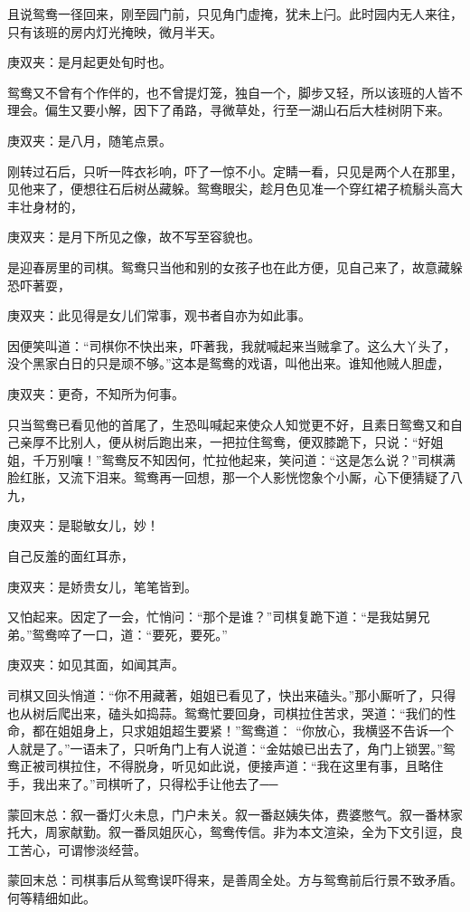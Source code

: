 \begin{parag}
    且说鸳鸯一径回来，刚至园门前，只见角门虚掩，犹未上闩。此时园内无人来往，只有该班的房内灯光掩映，微月半天。\begin{note}庚双夹：是月起更处旬时也。\end{note}鸳鸯又不曾有个作伴的，也不曾提灯笼，独自一个，脚步又轻，所以该班的人皆不理会。偏生又要小解，因下了甬路，寻微草处，行至一湖山石后大桂树阴下来。\begin{note}庚双夹：是八月，随笔点景。\end{note}刚转过石后，只听一阵衣衫响，吓了一惊不小。定睛一看，只见是两个人在那里，见他来了，便想往石后树丛藏躲。鸳鸯眼尖，趁月色见准一个穿红裙子梳鬅头高大丰壮身材的，\begin{note}庚双夹：是月下所见之像，故不写至容貌也。\end{note}是迎春房里的司棋。鸳鸯只当他和别的女孩子也在此方便，见自己来了，故意藏躲恐吓著耍，\begin{note}庚双夹：此见得是女儿们常事，观书者自亦为如此事。\end{note}因便笑叫道：“司棋你不快出来，吓著我，我就喊起来当贼拿了。这么大丫头了，没个黑家白日的只是顽不够。”这本是鸳鸯的戏语，叫他出来。谁知他贼人胆虚，\begin{note}庚双夹：更奇，不知所为何事。\end{note}只当鸳鸯已看见他的首尾了，生恐叫喊起来使众人知觉更不好，且素日鸳鸯又和自己亲厚不比别人，便从树后跑出来，一把拉住鸳鸯，便双膝跪下，只说：“好姐姐，千万别嚷！”鸳鸯反不知因何，忙拉他起来，笑问道：“这是怎么说？”司棋满脸红胀，又流下泪来。鸳鸯再一回想，那一个人影恍惚象个小厮，心下便猜疑了八九，\begin{note}庚双夹：是聪敏女儿，妙！\end{note}自己反羞的面红耳赤，\begin{note}庚双夹：是娇贵女儿，笔笔皆到。\end{note}又怕起来。因定了一会，忙悄问：“那个是谁？”司棋复跪下道：“是我姑舅兄弟。”鸳鸯啐了一口，道：“要死，要死。”\begin{note}庚双夹：如见其面，如闻其声。\end{note}司棋又回头悄道：“你不用藏著，姐姐已看见了，快出来磕头。”那小厮听了，只得也从树后爬出来，磕头如捣蒜。鸳鸯忙要回身，司棋拉住苦求，哭道：“我们的性命，都在姐姐身上，只求姐姐超生要紧！”鸳鸯道： “你放心，我横竖不告诉一个人就是了。”一语未了，只听角门上有人说道：“金姑娘已出去了，角门上锁罢。”鸳鸯正被司棋拉住，不得脱身，听见如此说，便接声道：“我在这里有事，且略住手，我出来了。”司棋听了，只得松手让他去了──
\end{parag}


\begin{parag}
    \begin{note}蒙回末总：叙一番灯火未息，门户未关。叙一番赵姨失体，费婆憋气。叙一番林家托大，周家献勤。叙一番凤姐灰心，鸳鸯传信。非为本文渲染，全为下文引逗，良工苦心，可谓惨淡经营。\end{note}
\end{parag}


\begin{parag}
    \begin{note}蒙回末总：司棋事后从鸳鸯误吓得来，是善周全处。方与鸳鸯前后行景不致矛盾。何等精细如此。\end{note}
\end{parag}
